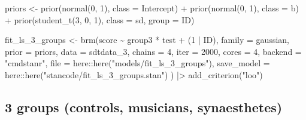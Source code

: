 \documentclass[
  man,floatsintext]{apa7}
\newenvironment{Shaded}{\begin{snugshade}}{\end{snugshade}}
\newcommand{\AttributeTok}[1]{\textcolor[rgb]{0.77,0.63,0.00}{#1}}
\newcommand{\DecValTok}[1]{\textcolor[rgb]{0.00,0.00,0.81}{#1}}
\newcommand{\FunctionTok}[1]{\textcolor[rgb]{0.00,0.00,0.00}{#1}}
\newcommand{\NormalTok}[1]{#1}
\newcommand{\OtherTok}[1]{\textcolor[rgb]{0.56,0.35,0.01}{#1}}
\newcommand{\SpecialCharTok}[1]{\textcolor[rgb]{0.00,0.00,0.00}{#1}}
\newcommand{\StringTok}[1]{\textcolor[rgb]{0.31,0.60,0.02}{#1}}
\begin{document}
\begin{Shaded}
\begin{Highlighting}[]
\NormalTok{priors }\OtherTok{\textless{}{-}} \FunctionTok{prior}\NormalTok{(}\FunctionTok{normal}\NormalTok{(}\DecValTok{0}\NormalTok{, }\DecValTok{1}\NormalTok{), }\AttributeTok{class =}\NormalTok{ Intercept) }\SpecialCharTok{+}
  \FunctionTok{prior}\NormalTok{(}\FunctionTok{normal}\NormalTok{(}\DecValTok{0}\NormalTok{, }\DecValTok{1}\NormalTok{), }\AttributeTok{class =}\NormalTok{ b) }\SpecialCharTok{+}
  \FunctionTok{prior}\NormalTok{(}\FunctionTok{student\_t}\NormalTok{(}\DecValTok{3}\NormalTok{, }\DecValTok{0}\NormalTok{, }\DecValTok{1}\NormalTok{), }\AttributeTok{class =}\NormalTok{ sd, }\AttributeTok{group =}\NormalTok{ ID) }

\NormalTok{fit\_ls\_3\_groups }\OtherTok{\textless{}{-}} \FunctionTok{brm}\NormalTok{(score }\SpecialCharTok{\textasciitilde{}}\NormalTok{ group3 }\SpecialCharTok{*}\NormalTok{ test }\SpecialCharTok{+}\NormalTok{ (}\DecValTok{1} \SpecialCharTok{|}\NormalTok{ ID),}
                      \AttributeTok{family =}\NormalTok{ gaussian,}
                      \AttributeTok{prior =}\NormalTok{ priors,}
                      \AttributeTok{data =}\NormalTok{ sdtdata\_3,}
                      \AttributeTok{chains =} \DecValTok{4}\NormalTok{, }\AttributeTok{iter =} \DecValTok{2000}\NormalTok{, }\AttributeTok{cores =} \DecValTok{4}\NormalTok{,}
                      \AttributeTok{backend =} \StringTok{"cmdstanr"}\NormalTok{,}
                      \AttributeTok{file =}\NormalTok{ here}\SpecialCharTok{::}\FunctionTok{here}\NormalTok{(}\StringTok{"models/fit\_ls\_3\_groups"}\NormalTok{),}
                      \AttributeTok{save\_model =}\NormalTok{ here}\SpecialCharTok{::}\FunctionTok{here}\NormalTok{(}\StringTok{"stancode/fit\_ls\_3\_groups.stan"}\NormalTok{)}
\NormalTok{                      ) }\SpecialCharTok{|\textgreater{}}
  \FunctionTok{add\_criterion}\NormalTok{(}\StringTok{"loo"}\NormalTok{)}
\end{Highlighting}
\end{Shaded}

\hypertarget{groups-controls-musicians-synaesthetes}{%
\subsection{3 groups (controls, musicians, synaesthetes)}\label{groups-controls-musicians-synaesthetes}}
\end{document}
